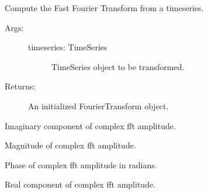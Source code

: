 \documentclass[letterpaper,10pt,english]{sphinxmanual}
\begin{document}
\begin{fulllineitems}
\begin{fulllineitems}
\begin{description}
\begin{description}
\end{description}

\end{description}

\end{fulllineitems}



\begin{fulllineitems}
Compute the Fast Fourier Transform from a timeseries.
\begin{description}
\item[{Args:}] \leavevmode\begin{description}
\item[{timeseries: TimeSeries }] \leavevmode
TimeSeries object to be transformed.

\end{description}

\item[{Returns:}] \leavevmode
An initialized FourierTransform object.

\end{description}

\end{fulllineitems}



\begin{fulllineitems}
Imaginary component of complex fft amplitude.

\end{fulllineitems}



\begin{fulllineitems}
Magnitude of complex fft amplitude.

\end{fulllineitems}



\begin{fulllineitems}
Phase of complex fft amplitude in radians.

\end{fulllineitems}



\begin{fulllineitems}
Real component of complex fft amplitude.


\end{fulllineitems}
\end{fulllineitems}
\end{document}
